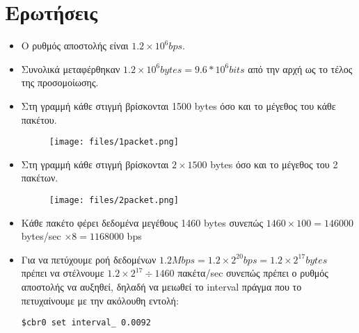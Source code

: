 \documentclass[a4paper,9pt]{article}
\begin{document}
\def\thesection {\Roman{section}.}


\section{Ερωτήσεις}
\begin{itemize}
    \item Ο ρυθμός αποστολής είναι $1.2\times10^6 bps$.
    \item Συνολικά μεταφέρθηκαν $1.2\times10^6 bytes = 9.6*10^6 bits$ από την αρχή
        ως το τέλος της προσομοίωσης.
    \item Στη γραμμή κάθε στιγμή βρίσκονται 1500 bytes όσο και το μέγεθος του
        κάθε πακέτου.
        \begin{figure}[h]
            \centering
            \texttt{[image: files/1packet.png]}
        \end{figure}
    \item Στη γραμμή κάθε στιγμή βρίσκονται $2\times1500$ bytes όσο και το μέγεθος του
        2 πακέτων.
        \begin{figure}[h]
            \centering
            \texttt{[image: files/2packet.png]}
        \end{figure}
    \item Κάθε πακέτο φέρει δεδομένα μεγέθους 1460 bytes συνεπώς
        $1460\times100 = 146000$ bytes/sec $\times 8 = 1168000$ bps
    \item Για να πετύχουμε ροή δεδομένων
        $1.2Mbps=1.2\times2^{20}bps=1.2\times2^{17}bytes$ πρέπει να στέλνουμε
        $1.2\times2^{17}\div1460$ πακέτα/sec συνεπώς πρέπει ο ρυθμός αποστολής
        να αυξηθεί, δηλαδή να μειωθεί το interval πράγμα που το πετυχαίνουμε
        με την ακόλουθη εντολή:
\begin{verbatim}
$cbr0 set interval_ 0.0092
\end{verbatim}

\end{itemize}
\end{document}

